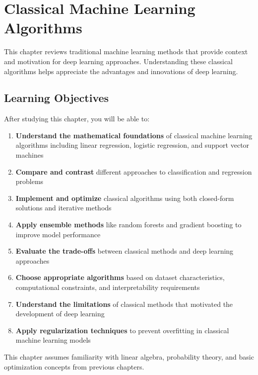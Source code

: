 
\chapter{Classical Machine Learning Algorithms}
\label{chap:classical-ml}

This chapter reviews traditional machine learning methods that provide context and motivation for deep learning approaches. Understanding these classical algorithms helps appreciate the advantages and innovations of deep learning.

\section*{Learning Objectives}

After studying this chapter, you will be able to:

\begin{enumerate}
    \item \textbf{Understand the mathematical foundations} of classical machine learning algorithms including linear regression, logistic regression, and support vector machines
    \item \textbf{Compare and contrast} different approaches to classification and regression problems
    \item \textbf{Implement and optimize} classical algorithms using both closed-form solutions and iterative methods
    \item \textbf{Apply ensemble methods} like random forests and gradient boosting to improve model performance
    \item \textbf{Evaluate the trade-offs} between classical methods and deep learning approaches
    \item \textbf{Choose appropriate algorithms} based on dataset characteristics, computational constraints, and interpretability requirements
    \item \textbf{Understand the limitations} of classical methods that motivated the development of deep learning
    \item \textbf{Apply regularization techniques} to prevent overfitting in classical machine learning models
\end{enumerate}

 This chapter assumes familiarity with linear algebra, probability theory, and basic optimization concepts from previous chapters.

